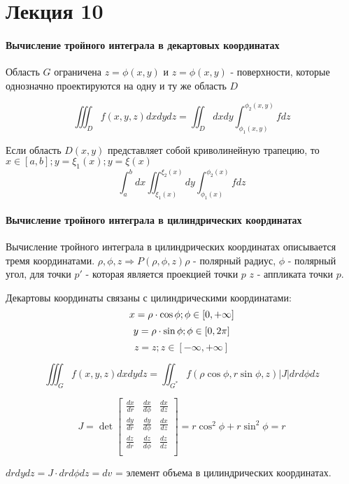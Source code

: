\chapter{Лекция 10}
\subsubsection{Вычисление тройного интеграла в декартовых координатах}
Область $G$ ограничена $z = \phi(x,y)$  и $z = \phi(x,y)$ - поверхности, которые однозначно проектируются на одну и ту же область $D$

$$\iiint_D f(x,y,z) dxdydz = \iint_D dxdy \int_{\phi_1(x,y)}^{\phi_2(x,y)} f dz$$

Если область $D(x,y)$ представляет собой криволинейную трапецию, то $x \in [a,b]; y = \xi_1(x); y = \xi(x)$
$$\int_a^bdx \iint_{\xi_1(x)}^{\xi_2(x)}dy\int_{\phi_1(x)}^{\phi_2(x)} f dz$$


\subsubsection{Вычисление тройного интеграла в цилиндрических координатах}
Вычисление тройного интеграла в цилиндрических координатах описывается тремя координатами. 
$\rho, \phi, z \Rightarrow P(\rho, \phi, z) \rho $ - полярный радиус, $\phi$ - полярный угол, для точки $p'$ - которая является проекцией точки $p$ $z$ - аппликата точки $p$.

Декартовы координаты связаны с цилиндрическими координатами: 
$$
x = \rho \cdot \cos \phi; \phi \in [0, +\infty]\\
$$
$$
y = \rho \cdot \sin \phi; \phi \in [0, 2\pi]\\ 
$$
$$
z = z; z \in [-\infty, +\infty]
$$

$$
 \iiint_G f(x,y,z) dxdydz = \iint_{G^*} f(\rho \cos \phi, r\sin \phi, z) |J| dr d\phi dz 
$$

$$
J =  \det \begin{bmatrix}
    \frac{dx}{dr} & \frac{dx}{d\phi} & \frac{dx}{dz} \\
    \frac{dy}{dr} & \frac{dy}{d\phi} & \frac{dx}{dz} \\
    \frac{dz}{dr} & \frac{dz}{d\phi} & \frac{dz}{dz} \\
\end{bmatrix} = r \cos^2 \phi + r \sin^2 \phi = r
$$

$
drdydz = J \cdot dr d\phi dz = dv
$ = элемент объема в цилиндрических координатах.

